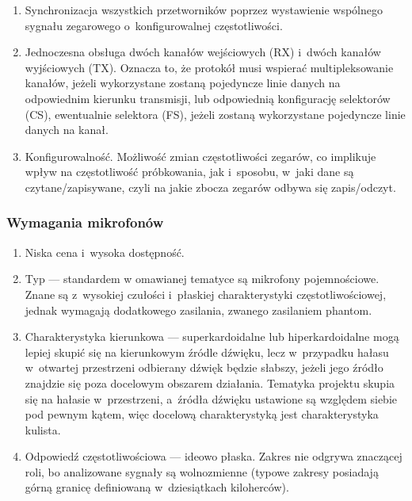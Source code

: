 \begin{enumerate}
    
    \item Synchronizacja wszystkich przetworników poprzez wystawienie wspólnego
    sygnału zegarowego o~konfigurowalnej częstotliwości.

    \item Jednoczesna obsługa dwóch kanałów wejściowych (RX) i~dwóch kanałów
    wyjściowych (TX). Oznacza to, że protokół musi wspierać multipleksowanie
    kanałów, jeżeli wykorzystane zostaną pojedyncze linie danych na odpowiednim
    kierunku transmisji, lub odpowiednią konfigurację selektorów (CS),
    ewentualnie selektora (FS), jeżeli zostaną wykorzystane pojedyncze linie
    danych na kanał.

    \item Konfigurowalność. Możliwość zmian częstotliwości zegarów, co implikuje
    wpływ na częstotliwość próbkowania, jak i~sposobu, w~jaki dane są
    czytane/zapisywane, czyli na jakie zbocza zegarów odbywa się zapis/odczyt.

\end{enumerate}

\subsubsection{Wymagania mikrofonów}

\begin{enumerate}

        \item Niska cena i~wysoka dostępność.

        \item Typ --- standardem w omawianej tematyce są mikrofony pojemnościowe.
        Znane są z~wysokiej czułości i~płaskiej charakterystyki
        częstotliwościowej, jednak wymagają dodatkowego zasilania, zwanego
        zasilaniem phantom.
    
        \item Charakterystyka kierunkowa --- superkardoidalne lub
        hiperkardoidalne mogą lepiej skupić się na kierunkowym źródle dźwięku,
        lecz w~przypadku hałasu w~otwartej przestrzeni odbierany dźwięk będzie
        słabszy, jeżeli jego źródło znajdzie się poza docelowym obszarem
        działania. Tematyka projektu skupia się na hałasie w~przestrzeni,
        a~źródła dźwięku ustawione są względem siebie pod pewnym kątem, więc
        docelową charakterystyką jest charakterystyka kulista.
    
        \item Odpowiedź częstotliwościowa --- ideowo płaska. Zakres nie odgrywa
        znaczącej roli, bo analizowane sygnały są wolnozmienne (typowe zakresy
        posiadają górną granicę definiowaną w~dziesiątkach kiloherców).

\end{enumerate}

